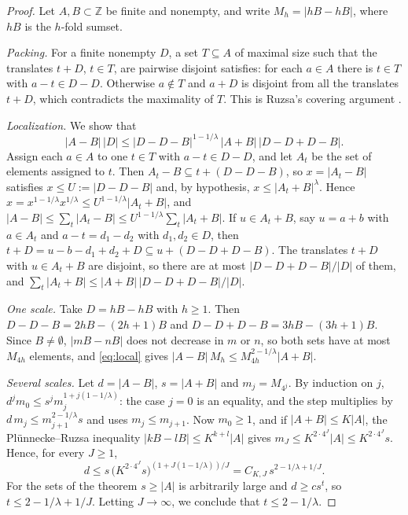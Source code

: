 \documentclass[11pt]{amsart}
\theoremstyle{definition}
\theoremstyle{remark}
\numberwithin{equation}{section}
\newcommand{\Z}{\mathbb{Z}}
\begin{document}
\begin{proof}
Let $A,B\subset\Z$ be finite and nonempty, and write $M_h=|hB-hB|$, where $hB$ is the $h$-fold sumset.

\emph{Packing.} For a finite nonempty $D$, a set $T\subseteq A$ of maximal size such that the translates $t+D$, $t\in T$, are pairwise disjoint satisfies: for each $a\in A$ there is $t\in T$ with $a-t\in D-D$. Otherwise $a\notin T$ and $a+D$ is disjoint from all the translates $t+D$, which contradicts the maximality of $T$. This is Ruzsa's covering argument \cite{Ru99}.

\emph{Localization.} We show that
\begin{equation}\label{eq:local}
|A-B|\,|D|\le|D-D-B|^{1-1/\lambda}\,|A+B|\,|D-D+D-B|.
\end{equation}
Assign each $a\in A$ to one $t\in T$ with $a-t\in D-D$, and let $A_t$ be the set of elements assigned to $t$. Then $A_t-B\subseteq t+(D-D-B)$, so $x=|A_t-B|$ satisfies $x\le U:=|D-D-B|$ and, by hypothesis, $x\le|A_t+B|^\lambda$. Hence $x=x^{1-1/\lambda}x^{1/\lambda}\le U^{1-1/\lambda}|A_t+B|$, and $|A-B|\le\sum_t|A_t-B|\le U^{1-1/\lambda}\sum_t|A_t+B|$. If $u\in A_t+B$, say $u=a+b$ with $a\in A_t$ and $a-t=d_1-d_2$ with $d_1,d_2\in D$, then $t+D=u-b-d_1+d_2+D\subseteq u+(D-D+D-B)$. The translates $t+D$ with $u\in A_t+B$ are disjoint, so there are at most $|D-D+D-B|/|D|$ of them, and $\sum_t|A_t+B|\le|A+B|\,|D-D+D-B|/|D|$.

\emph{One scale.} Take $D=hB-hB$ with $h\ge1$. Then $D-D-B=2hB-(2h+1)B$ and $D-D+D-B=3hB-(3h+1)B$. Since $B\ne\emptyset$, $|mB-nB|$ does not decrease in $m$ or $n$, so both sets have at most $M_{4h}$ elements, and \eqref{eq:local} gives $|A-B|\,M_h\le M_{4h}^{2-1/\lambda}|A+B|$.

\emph{Several scales.} Let $d=|A-B|$, $s=|A+B|$ and $m_j=M_{4^j}$. By induction on $j$, $d^jm_0\le s^jm_j^{1+j(1-1/\lambda)}$: the case $j=0$ is an equality, and the step multiplies by $d\,m_j\le m_{j+1}^{2-1/\lambda}s$ and uses $m_j\le m_{j+1}$. Now $m_0\ge1$, and if $|A+B|\le K|A|$, the Pl\"unnecke--Ruzsa inequality $|kB-lB|\le K^{k+l}|A|$ \cite[Theorem~1.2]{Pet12} gives $m_J\le K^{2\cdot4^J}|A|\le K^{2\cdot4^J}s$. Hence, for every $J\ge1$,
\[
d\le s\,\bigl(K^{2\cdot4^J}s\bigr)^{(1+J(1-1/\lambda))/J}=C_{K,J}\,s^{2-1/\lambda+1/J}.
\]
For the sets of the theorem $s\ge|A|$ is arbitrarily large and $d\ge cs^t$, so $t\le2-1/\lambda+1/J$. Letting $J\to\infty$, we conclude that $t\le2-1/\lambda$.
\end{proof}
\end{document}
